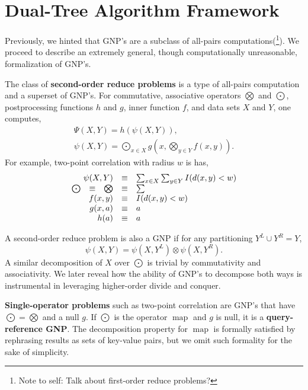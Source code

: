\documentclass[twoside,leqno,twocolumn]{article}
\newcommand{\authornote}[1]{(\footnote{Note to self: #1})}
\newcommand{\authorsnote}[1]{\authornote{#1}}
\newcommand{\union}{\cup}
\DeclareMathOperator*{\map}{map}
\newcommand{\Gnp}{\Psi}
\newcommand{\gnp}{\psi}
\newcommand{\defterm}[1]{{\bf #1}}
\newcommand{\kdleft}[1]{#1^{\!L}}
\newcommand{\kdright}[1]{#1^{\!R}}
\begin{document}
\section{Dual-Tree Algorithm Framework}

Previously, we hinted that GNP's are a subclass of all-pairs computations\authorsnote{Talk about first-order reduce problems?}.
We proceed to describe an extremely general, though computationally unreasonable, formalization of GNP's.

The class of \defterm{second-order reduce problems} is a type of all-pairs computation and a superset of GNP's.
For commutative, associative operators $\bigotimes$ and $\bigodot$, postprocessing functions $h$ and $g$, inner function $f$, and data sets $X$ and $Y$, one computes,
\[\begin{array}{l}
  \displaystyle \Gnp(X, Y) = h(\gnp(X, Y)),
  \\
  \displaystyle \gnp(X, Y) = \bigodot_{x \in X} g\!\left(x, \bigotimes_{y \in Y} f(x, y) \right).
\end{array}\]
\noindent
For example, two-point correlation with radius $w$ is has,
\[\begin{array}{ccccl}
  \multicolumn{3}{r}{\gnp(X, Y)} &\equiv& \sum_{x \in X} \sum_{y \in Y} I(d(x, y) < w)
  \\
  \bigodot &\equiv& \bigotimes &\equiv& \sum
  \\
  \multicolumn{3}{r}{f(x,y)} &\equiv& I(d(x,y) < w)
  \\
  \multicolumn{3}{r}{g(x, a)} &\equiv& a
  \\
  \multicolumn{3}{r}{h(a)} &\equiv& a
\end{array}\]

A second-order reduce problem is also a GNP if for any partitioning $\kdleft{Y} \union \kdright{Y} = Y$,
\[\gnp(X,Y) = \gnp(X,\kdleft{Y}) \otimes \gnp(X,\kdright{Y}).\]
\noindent A similar decomposition of $X$ over $\bigodot$ is trivial by commutativity and associativity.
We later reveal how the ability of GNP's to decompose both ways is instrumental in leveraging higher-order divide and conquer.

\defterm{Single-operator problems} such as two-point correlation are GNP's that have $\bigodot = \bigotimes$ and a null $g$.
If $\bigodot$ is the operator $\map$ and $g$ is null, it is a \defterm{query-reference GNP}.
The decomposition property for $\map$ is formally satisfied by rephrasing results as sets of key-value pairs, but we omit such formality for the sake of simplicity.
\end{document}
